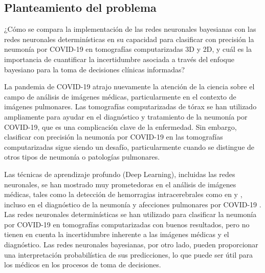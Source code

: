\documentclass[10pt, oneside, a4paper]{article}
\begin{document}
	
	\subsection{Planteamiento del problema} \label{problema}
	

	
	
	¿Cómo se compara la implementación de las redes neuronales bayesianas con las redes neuronales determinísticas en su capacidad para clasificar con precisión la neumonía por COVID-19 en tomografías computarizadas 3D y 2D, y cuál es la importancia de cuantificar la incertidumbre asociada a través del enfoque bayesiano para la toma de decisiones clínicas informadas?
	
	La pandemia de COVID-19 atrajo nuevamente la atención de la ciencia sobre el campo de análisis de imágenes médicas, particularmente en el contexto de imágenes pulmonares. Las tomografías computarizadas de tórax se han utilizado ampliamente para ayudar en el diagnóstico y tratamiento de la neumonía por COVID-19, que es una complicación clave de la enfermedad. Sin embargo, clasificar con precisión la neumonía por COVID-19 en las tomografías computarizadas sigue siendo un desafío, particularmente cuando se distingue de otros tipos de neumonía o patologías pulmonares.   
		
	Las técnicas de aprendizaje profundo (Deep Learning), incluidas las redes neuronales, se han mostrado muy prometedoras en el análisis de imágenes médicas, tales como la detección de hemorragias intracerebrales como en \cite{Sharrock2021} y \cite{Chang1609} , incluso en el diagnóstico de la neumonía y afecciones pulmonares por COVID-19 \cite{nn_lung_lesions}. Las redes neuronales determinísticas se han utilizado para clasificar la neumonía por COVID-19 en tomografías computarizadas con buenos resultados, pero no tienen en cuenta la incertidumbre inherente a las imágenes médicas y el diagnóstico. Las redes neuronales bayesianas, por otro lado, pueden proporcionar una interpretación probabilística de sus predicciones, lo que puede ser útil para los médicos en los procesos de toma de decisiones.
	
\end{document}
